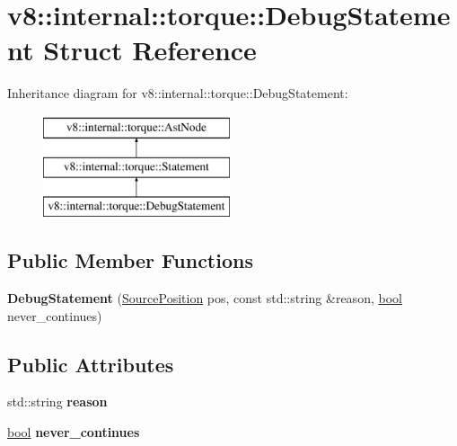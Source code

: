 \hypertarget{structv8_1_1internal_1_1torque_1_1DebugStatement}{}\section{v8\+:\+:internal\+:\+:torque\+:\+:Debug\+Statement Struct Reference}
\label{structv8_1_1internal_1_1torque_1_1DebugStatement}
Inheritance diagram for v8\+:\+:internal\+:\+:torque\+:\+:Debug\+Statement\+:\begin{figure}[H]
\begin{center}
\leavevmode
\includegraphics[height=3.000000cm]{structv8_1_1internal_1_1torque_1_1DebugStatement}
\end{center}
\end{figure}
\subsection*{Public Member Functions}
\begin{DoxyCompactItemize}
\item 
\mbox{\label{structv8_1_1internal_1_1torque_1_1DebugStatement_aa2c9ad9021d17025644be9ec9a49037c}} 
{\bfseries Debug\+Statement} (\mbox{\hyperlink{structv8_1_1internal_1_1torque_1_1SourcePosition}{Source\+Position}} pos, const std\+::string \&reason, \mbox{\hyperlink{classbool}{bool}} never\+\_\+continues)
\end{DoxyCompactItemize}
\subsection*{Public Attributes}
\begin{DoxyCompactItemize}
\item 
\mbox{\label{structv8_1_1internal_1_1torque_1_1DebugStatement_a105421c7065df22d1d2503ae67fae270}} 
std\+::string {\bfseries reason}
\item 
\mbox{\label{structv8_1_1internal_1_1torque_1_1DebugStatement_ab7a107338d37d66946aac5e8cb0a2dd5}} 
\mbox{\hyperlink{classbool}{bool}} {\bfseries never\+\_\+continues}
\end{DoxyCompactItemize}
